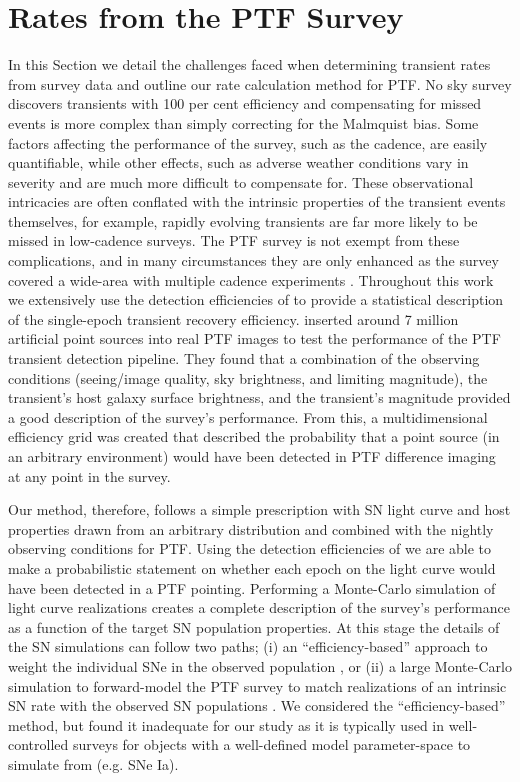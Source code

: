 \documentclass[a4paper,fleqn,usenatbib]{mnras}
\begin{document}
\section{Rates from the PTF Survey}
\label{sec:ratesPTF}

In this Section we detail the challenges faced when determining transient rates from survey data and outline our rate calculation method for PTF. No sky survey discovers transients with 100 per cent efficiency and compensating for missed events is more complex than simply correcting for the Malmquist bias. Some factors affecting the performance of the survey, such as the cadence, are easily quantifiable, while other effects, such as adverse weather conditions vary in severity and are much more difficult to compensate for. These observational intricacies are often conflated with the intrinsic properties of the transient events themselves, for example, rapidly evolving transients are far more likely to be missed in low-cadence surveys. The PTF survey is not exempt from these complications, and in many circumstances they are only enhanced as the survey covered a wide-area with multiple cadence experiments \citep{PTF_REF}. Throughout this work we extensively use the detection efficiencies of \cite{Frohmaier17} to provide a statistical description of the single-epoch transient recovery efficiency. \citet{Frohmaier17} inserted around 7 million artificial point sources into real PTF images to test the performance of the PTF transient detection pipeline. They found that a combination of the observing conditions (seeing/image quality, sky brightness, and limiting magnitude), the transient's host galaxy surface brightness, and the transient's magnitude provided a good description of the survey's performance. From this, a multidimensional efficiency grid was created that described the probability that a point source (in an arbitrary environment) would have been detected in PTF difference imaging at any point in the survey.

Our method, therefore, follows a simple prescription with SN light curve and host properties drawn from an arbitrary distribution and combined with the nightly observing conditions for PTF. Using the detection efficiencies of \citet{Frohmaier17} we are able to make a probabilistic statement on whether each epoch on the light curve would have been detected in a PTF pointing. Performing a Monte-Carlo simulation of light curve realizations creates a complete description of the survey's performance as a function of the target SN population properties. At this stage the details of the SN simulations can follow two paths; (i) an ``efficiency-based'' approach to weight the individual SNe in the observed population \citep[e.g.][]{Perrett12, Frohmaier19}, or (ii) a large Monte-Carlo simulation to forward-model the PTF survey to match realizations of an intrinsic SN rate with the observed SN populations \citep[e.g.][]{Prajs2016,Frohmaier18}. We considered the ``efficiency-based'' method, but found it inadequate for our study as it is typically used in well-controlled surveys for objects with a well-defined model parameter-space to simulate from (e.g. SNe Ia).
\end{document}
